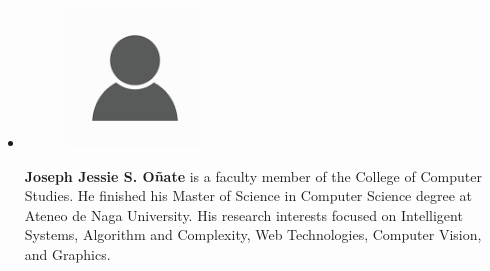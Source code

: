 \begin{vita}
\begin{itemize}
    \item 
    
    \begin{figure}[ht]
        \centering
    	\includegraphics[width=0.35\textwidth]{figures/person-icon.png}
    \end{figure}
    
    \textbf{Joseph Jessie S. Oñate} is a faculty member of the College of Computer Studies. He finished his Master of Science in Computer Science degree at Ateneo de Naga University. His research interests focused on Intelligent Systems, Algorithm and Complexity, Web Technologies, Computer Vision, and Graphics.
\end{itemize}

\end{vita}